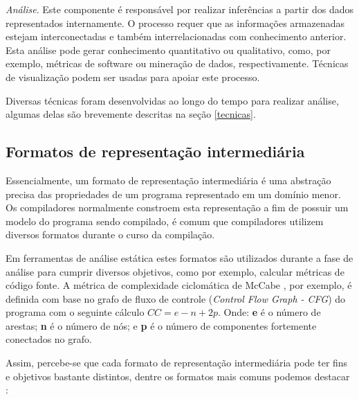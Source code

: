\begin{description}
  \item \textit{Análise}.
    Este componente é responsável por realizar inferências a partir dos dados
    representados internamente. O processo requer que as informações
    armazenadas estejam interconectadas e também interrelacionadas com
    conhecimento anterior. Esta análise pode gerar conhecimento quantitativo
    ou qualitativo, como, por exemplo, métricas de software ou mineração de
    dados, respectivamente. Técnicas de visualização podem ser usadas para
    apoiar este processo.

    Diversas técnicas foram desenvolvidas ao longo do tempo para realizar
    análise, algumas delas são brevemente descritas na seção \ref{tecnicas}.

\end{description}

\subsection{Formatos de representação intermediária} \label{formatos}

Essencialmente, um formato de representação intermediária é uma abstração precisa
das propriedades de um programa representado em um domínio menor. Os
compiladores normalmente constroem esta representação a fim de possuir um
modelo do programa sendo compilado, é comum que compiladores utilizem diversos
formatos durante o curso da compilação.

Em ferramentas de análise estática estes formatos são utilizados durante a
fase de análise para cumprir diversos objetivos, como por exemplo, calcular
métricas de código fonte. A métrica de complexidade ciclomática de McCabe
\cite{McCabe1976}, por exemplo, é definida com base no grafo de fluxo de controle ({\it Control Flow Graph - CFG}) do
programa com o seguinte cálculo $CC = e - n + 2p$. Onde: {\bf e} é o número de
arestas; {\bf n} é o número de nós; e {\bf p} é o número de componentes
fortemente conectados no grafo.

Assim, percebe-se que cada formato de representação intermediária pode ter fins
e objetivos bastante distintos, dentre os formatos mais comuns podemos destacar
\cite{Nielson2015, Stanier2013, Cruz2009, Ramalho1996}:

